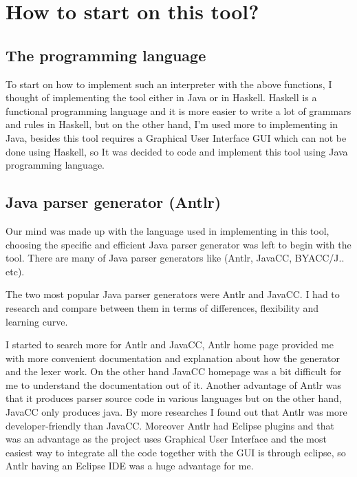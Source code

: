 \documentclass[a4paper]{article}
\begin{document}
\newpage

\section{How to start on this tool?}
\subsection{The programming language}
To start on how to implement such an interpreter with the above functions, I thought of implementing the tool either in Java or in Haskell. Haskell is a functional programming language and it is more easier to write a lot of grammars and rules in Haskell, but on the other hand, I'm used more to implementing in Java, besides this tool requires a Graphical User Interface GUI which can not be done using Haskell, so It was decided to code and implement this tool using Java programming language.

\subsection{Java parser generator (Antlr)}

Our mind was made up with the language used in implementing in this tool, choosing the specific and efficient Java parser generator was left to begin with the tool. There are many of Java parser generators like (Antlr, JavaCC, BYACC/J.. etc).

The two most popular Java parser generators were Antlr and JavaCC. I had to research and compare between them in terms of differences, flexibility and learning curve.

I started to search more for Antlr and JavaCC, Antlr home page provided me with more convenient documentation and explanation about how the generator and the lexer work.
On the other hand JavaCC homepage was a bit difficult for me to understand the documentation out of it.
Another advantage of Antlr was that it produces parser source code in various languages but on the other hand, JavaCC only produces java. By more researches I found out that Antlr was more developer-friendly than JavaCC.
Moreover Antlr had Eclipse plugins and that was an advantage as the project uses Graphical User Interface and the most easiest way to integrate all the code together with the GUI is through eclipse, so Antlr having an Eclipse IDE was a huge advantage for me.
\end{document}
